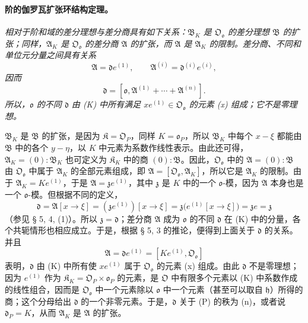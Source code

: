 \documentclass[11pt]{article}
\begin{document}
\paragraph{阶的伽罗瓦扩张环结构定理。}
\emph{相对于阶和域的差分理想与差分商具有如下关系：\(\mathfrak B_K\) 是 \(\mathfrak O_{\mathfrak o}\) 的差分理想 \(\mathfrak B\) 的扩张；同样，\(\mathfrak A_K\) 是 \(\mathfrak O_{\mathfrak o}\) 的差分商 \(\mathfrak A\) 的扩张，而 \(\mathfrak A\) 是 \(\mathfrak A_K\) 的限制。差分商、不同和单位元分量之间具有关系}
\[
\mathfrak A=\mathfrak d e^{(1)},
\qquad
\mathfrak A^{(i)}=\mathfrak d^{(i)}e^{(i)},
\]
\emph{因而}
\[
\mathfrak d=[\mathfrak o,\mathfrak A^{(1)}+\cdots+\mathfrak A^{(n)}].
\]
\emph{所以，\(\mathfrak o\) 的不同 \(\mathfrak d\) 由 (K) 中所有满足 \(xe^{(1)}\in\mathfrak O_{\mathfrak o}\) 的元素 (x) 组成；它不是零理想。}

\(\mathfrak B_K\) 是 \(\mathfrak B\) 的扩张，是因为 \(\mathfrak K=\mathfrak O_P\)，同样 \(K=\mathfrak o_P\)，所以 \(\mathfrak B_K\) 中每个 \(x-\xi\) 都能由 \(\mathfrak B\) 中的各个 \(y-\eta\)，以 \(K\) 中元素为系数作线性表示。由此还可得，\(\mathfrak A_K=(0):\mathfrak B_K\) 也可定义为 \(\mathfrak K_K\) 中的商 \((0):\mathfrak B\)。因此，\(\mathfrak O_{\mathfrak o}\) 中的 \(\mathfrak A=(0):\mathfrak B\) 由 \(\mathfrak O_{\mathfrak o}\) 中属于 \(\mathfrak A_K\) 的全部元素组成，即 \(\mathfrak A=[\mathfrak O_{\mathfrak o},\mathfrak A_K]\)，所以它是 \(\mathfrak A_K\) 的限制。由于 \(\mathfrak A_K=Ke^{(1)}\)，于是 \(\mathfrak A=\mathfrak z e^{(1)}\)，其中 \(\mathfrak z\) 是 \(K\) 中的一个 \(\mathfrak o\)-模，因为 \(\mathfrak A\) 本身也是一个 \(\mathfrak o\)-模。但根据不同的定义，
\[
\mathfrak d=\mathfrak A[x\to\xi]
=(\mathfrak z e^{(1)})[x\to\xi]
=\mathfrak z\bigl(e^{(1)}[x\to\xi]\bigr)=\mathfrak z e=\mathfrak z
\]
（参见 § 5, 4, (1)）。所以 \(\mathfrak z=\mathfrak d\)；差分商 \(\mathfrak A\) 成为 \(\mathfrak o\) 的不同 \(\mathfrak d\) 在 (K) 中的分量，各个共轭情形也相应成立。于是，根据 § 5, 3 的推论，便得到上面关于 \(\mathfrak d\) 的关系。并且
\[
\mathfrak A=\mathfrak d e^{(1)}=[Ke^{(1)},\mathfrak O_{\mathfrak o}]
\]
表明，\(\mathfrak d\) 由 (K) 中所有使 \(xe^{(1)}\) 属于 \(\mathfrak O_{\mathfrak o}\) 的元素 (x) 组成。由此 \(\mathfrak d\) 不是零理想；因为 \(e^{(1)}\) 作为 \(\mathfrak K_K=\mathfrak O_P\times\mathfrak o_P\) 的元素，是 \(\mathfrak O\) 中有限多个元素以 (K) 中系数作成的线性组合，因而是 \(\mathfrak O_{\mathfrak o}\) 中一个元素除以 \(\mathfrak o\) 中一个元素（甚至可以取自 \(\mathfrak h\)）所得的商；这个分母给出 \(\mathfrak d\) 的一个非零元素。于是，\(\mathfrak d\) 关于 (P) 的秩为 (n)，或者说 \(\mathfrak d_P=K\)，从而 \(\mathfrak A_K\) 是 \(\mathfrak A\) 的扩张。
\end{document}
